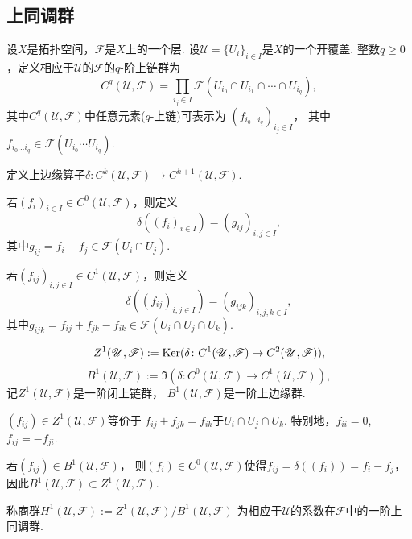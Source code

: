 \subsection{上同调群}

\begin{definition}
    设$X$是拓扑空间，$\mathscr{F}$是$X$上的一个层. 
    设$\mathscr{U}=\{U_i\}_{i\in I}$是$X$的一个开覆盖. 
    整数$q\geq 0$，定义相应于$\mathscr{U}$的$\mathscr{F}$的$q$-阶上链群为
	$$C^q(\mathscr{U},\mathscr{F})
    =\prod_{i_j\in I} \mathscr{F}(U_{i_0}\cap U_{i_1}\cap \cdots \cap U_{i_q}),$$
	其中$C^q(\mathscr{U},\mathscr{F})$中任意元素($q$-上链)可表示为
    $(f_{i_0\ldots i_q})_{i_j\in I}$，
    其中$f_{i_0\ldots i_{q}}\in \mathscr{F}(U_{i_0}\cdots U_{i_q})$.
\end{definition}
		
\begin{definition}
    定义上边缘算子$\delta\colon C^k(\mathscr{U},\mathscr{F})\rightarrow C^{k+1}(\mathscr{U},\mathscr{F})$.

	若$(f_i)_{i\in I}\in C^0(\mathscr{U},\mathscr{F})$，则定义
	$$\delta((f_i)_{i\in I})=(g_{ij})_{i,j\in I},$$
	其中$g_{ij}=f_i-f_j\in \mathscr{F}(U_i\cap U_j)$.

	若$(f_{ij})_{i,j\in I}\in C^1(\mathscr{U},\mathscr{F})$，则定义
	$$\delta((f_{ij})_{i,j\in I})=(g_{ijk})_{i,j,k\in I},$$
	其中$g_{ijk}=f_{ij}+f_{jk}-f_{ik}\in \mathscr{F}(U_i\cap U_j\cap U_k)$.
\end{definition}
		
\begin{definition}
	$$Z^1(\mathscr{U},\mathscr{F}):=\operatorname{Ker}(\delta\colon C^1(\mathscr{U},\mathscr{F})\rightarrow C^2(\mathscr{U},\mathscr{F})),$$
	$$B^1(\mathscr{U},\mathscr{F}):=\Im(\delta\colon C^0(\mathscr{U},\mathscr{F})\rightarrow C^1(\mathscr{U},\mathscr{F})),$$
	记$Z^1(\mathscr{U},\mathscr{F})$是一阶闭上链群，
    $B^1(\mathscr{U},\mathscr{F})$是一阶上边缘群.
		
	$(f_{ij})\in Z^1(\mathscr{U},\mathscr{F})$等价于
    $f_{ij}+f_{jk}=f_{ik}$于$U_i\cap U_j\cap U_k$. 
    特别地，$f_{ii}=0$, $f_{ij}=-f_{ji}$.

	若$(f_{ij})\in B^1(\mathscr{U},\mathscr{F})$，
    则$(f_i)\in C^0(\mathscr{U},\mathscr{F})$使得$f_{ij}=\delta((f_i))=f_i-f_j$，
    因此$B^1(\mathscr{U},\mathscr{F})\subset Z^1(\mathscr{U},\mathscr{F})$.
		
	称商群$H^1(\mathscr{U},\mathscr{F}):=Z^1(\mathscr{U},\mathscr{F})/B^1(\mathscr{U},\mathscr{F})$
    为相应于$\mathscr{U}$的系数在$\mathscr{F}$中的一阶上同调群.
\end{definition}
		
